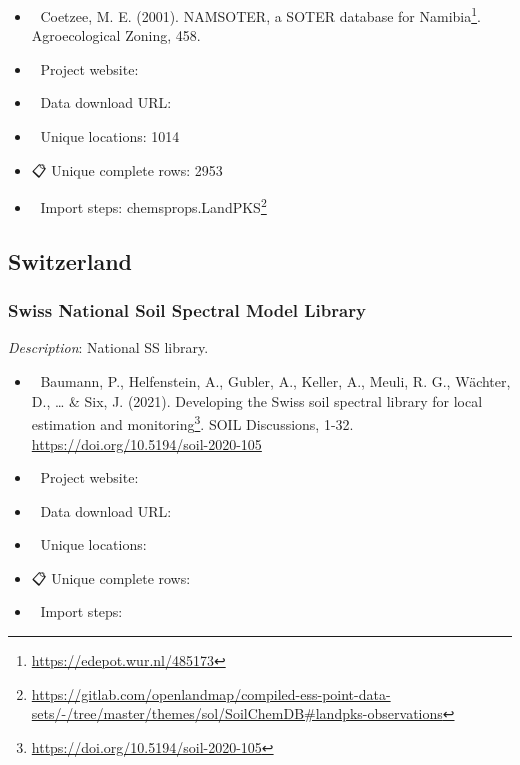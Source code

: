 \documentclass[
  graybox,natbib,nospthms]{svmono}
\providecommand{\tightlist}{%
  \setlength{\itemsep}{0pt}\setlength{\parskip}{0pt}}
\providecommand{\tightlist}{\setlength{\itemsep}{0pt}\setlength{\parskip}{0pt}}
\renewcommand{\href}[2]{#2 (\url{#1})}
\renewcommand{\href}[2]{#2\footnote{\url{#1}}}
\begin{document}
\begin{itemize}
\tightlist
\item
  📕 Coetzee, M. E. (2001). \href{https://edepot.wur.nl/485173}{NAMSOTER, a SOTER database for Namibia}. Agroecological Zoning, 458.\\
\item
  🔗 Project website:\\
\item
  📂 Data download URL:\\
\item
  📍 Unique locations: 1014\\
\item
  📋 Unique complete rows: 2953\\
\item
  📝 Import steps: \href{https://gitlab.com/openlandmap/compiled-ess-point-data-sets/-/tree/master/themes/sol/SoilChemDB\#landpks-observations}{chemsprops.LandPKS}
\end{itemize}

\hypertarget{switzerland}{%
\subsection{Switzerland}\label{switzerland}}

\hypertarget{swiss-national-soil-spectral-model-library}{%
\subsubsection{Swiss National Soil Spectral Model Library}\label{swiss-national-soil-spectral-model-library}}

\emph{Description}: National SS library.

\begin{itemize}
\tightlist
\item
  📕 Baumann, P., Helfenstein, A., Gubler, A., Keller, A., Meuli, R. G., Wächter, D., \ldots{} \& Six, J. (2021). \href{https://doi.org/10.5194/soil-2020-105}{Developing the Swiss soil spectral library for local estimation and monitoring}. SOIL Discussions, 1-32. \url{https://doi.org/10.5194/soil-2020-105}\\
\item
  🔗 Project website:\\
\item
  📂 Data download URL:\\
\item
  📍 Unique locations:\\
\item
  📋 Unique complete rows:\\
\item
  📝 Import steps:
\end{itemize}
\end{document}
